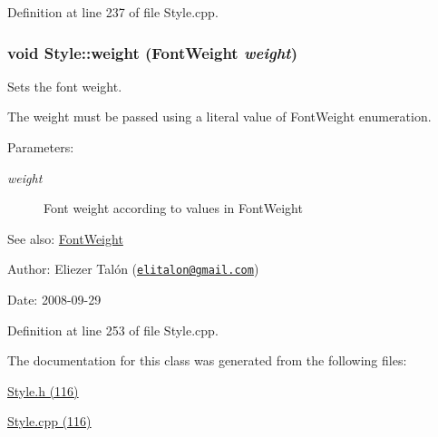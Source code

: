 Definition at line 237 of file Style.cpp.\hypertarget{class_style_f1273b59bdfe98b24410177f1eea7732}{
\subsubsection[weight]{\setlength{\rightskip}{0pt plus 5cm}void Style::weight ({\bf FontWeight} {\em weight})}}
\label{class_style_f1273b59bdfe98b24410177f1eea7732}


Sets the font weight. 

The weight must be passed using a literal value of FontWeight enumeration.

\begin{Desc}
\item[Parameters:]
\begin{description}
\item[{\em weight}]Font weight according to values in FontWeight\end{description}
\end{Desc}
\begin{Desc}
\item[See also:]\hyperlink{_font_weight_8h_ecff23ba4a68486421bcea57e095fe66}{FontWeight}\end{Desc}
\begin{Desc}
\item[Author:]Eliezer Talón (\href{mailto:elitalon@gmail.com}{\tt elitalon@gmail.com}) \end{Desc}
\begin{Desc}
\item[Date:]2008-09-29 \end{Desc}


Definition at line 253 of file Style.cpp.

The documentation for this class was generated from the following files:\begin{CompactItemize}
\item 
\hyperlink{_style_8h}{Style.h (116)}\item 
\hyperlink{_style_8cpp}{Style.cpp (116)}\end{CompactItemize}
